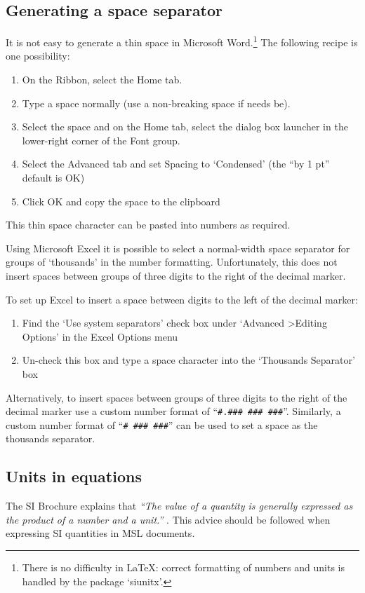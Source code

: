 \subsection{Generating a space separator}
It is not easy to generate a thin space in Microsoft Word.\footnote{There is no difficulty in \LaTeX: correct formatting of numbers and units is handled by the package `siunitx'.} The following recipe is one possibility:
\begin{enumerate}
\item On the Ribbon, select the Home tab.
\item Type a space normally (use a non-breaking space if needs be).
\item Select the space and on the Home tab, select the dialog box launcher in the lower-right corner of the Font group.
\item Select the Advanced tab and set Spacing to `Condensed' (the ``by 1 pt'' default is OK)
\item Click OK and copy the space to the clipboard 
\end{enumerate}

This thin space character can be pasted into numbers as required.

Using Microsoft Excel it is possible to select a normal-width space separator for groups of `thousands'  in the number formatting. Unfortunately, this does not insert spaces between groups of three digits to the right of the decimal marker. 

To set up Excel to insert a space between digits to the left of the decimal marker:
\begin{enumerate}
\item Find the `Use system separators' check box under `Advanced \textgreater Editing Options' in the Excel Options menu 
\item Un-check this box and type a space character into the `Thousands Separator' box
\end{enumerate} 

Alternatively, to insert spaces between groups of three digits to the right of the decimal marker use a custom number format of ``\verb|#.### ### ###|''. Similarly, a custom number format of ``\verb|# ### ###|'' can be used to set a space as the thousands separator.

\subsection{Units in equations}
The SI Brochure explains that \textit{``The value of a quantity is generally expressed as the product of a number and a unit.''} \cite[\S2.1]{SI9}. This advice should be followed when expressing SI quantities in MSL documents.

